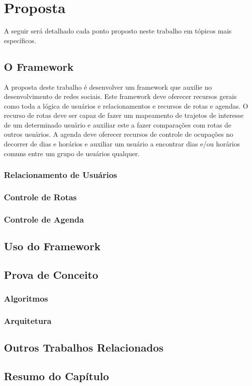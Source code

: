\chapter{Proposta}

A seguir será detalhado cada ponto proposto neste trabalho em tópicos mais específicos.

\section{O Framework}

A proposta deste trabalho é desenvolver um framework que auxilie no desenvolvimento de redes sociais. Este framework deve oferecer recursos gerais como toda a lógica de usuários e relacionamentos e recursos de rotas e agendas. O recurso de rotas deve ser capaz de fazer um mapeamento de trajetos de interesse de um determinado usuário e auxiliar este a fazer comparações com rotas de outros usuários. A agenda deve oferecer recursos de controle de ocupações no decorrer de dias e horários e auxiliar um usuário a encontrar dias e/ou horários comuns entre um grupo de usuários qualquer.

\subsection{Relacionamento de Usuários}

\subsection{Controle de Rotas}

\subsection{Controle de Agenda}

\section{Uso do Framework}

\section{Prova de Conceito}

\subsection{Algoritmos}

\subsection{Arquitetura}

\section{Outros Trabalhos Relacionados}

\section{Resumo do Capítulo}
